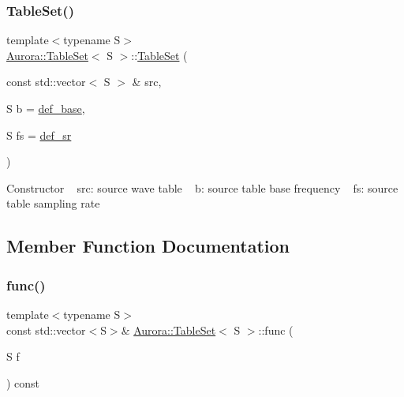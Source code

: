 \subsubsection{\texorpdfstring{Table\+Set()}{TableSet()}\hspace{0.1cm}{\footnotesize\ttfamily [2/2]}}
{\footnotesize\ttfamily template$<$typename S$>$ \\
\hyperlink{class_aurora_1_1_table_set}{Aurora\+::\+Table\+Set}$<$ S $>$\+::\hyperlink{class_aurora_1_1_table_set}{Table\+Set} (\begin{DoxyParamCaption}\item[{const std\+::vector$<$ S $>$ \&}]{src,  }\item[{S}]{b = {\ttfamily \hyperlink{namespace_aurora_acb267dff62f74484893c2d5b679b78bf}{def\+\_\+base}},  }\item[{S}]{fs = {\ttfamily \hyperlink{namespace_aurora_ad49263d809bea98dd422e95bc91bc03e}{def\+\_\+sr}} }\end{DoxyParamCaption})\hspace{0.3cm}{\ttfamily [inline]}}

Constructor ~\newline
src\+: source wave table ~\newline
b\+: source table base frequency ~\newline
fs\+: source table sampling rate 

\subsection{Member Function Documentation}
\mbox{\label{class_aurora_1_1_table_set_afd4c6f1ba81f6ae1feb42eabd95c1b7f}} 
\subsubsection{\texorpdfstring{func()}{func()}}
{\footnotesize\ttfamily template$<$typename S$>$ \\
const std\+::vector$<$S$>$\& \hyperlink{class_aurora_1_1_table_set}{Aurora\+::\+Table\+Set}$<$ S $>$\+::func (\begin{DoxyParamCaption}\item[{S}]{f }\end{DoxyParamCaption}) const\hspace{0.3cm}{\ttfamily [inline]}}

